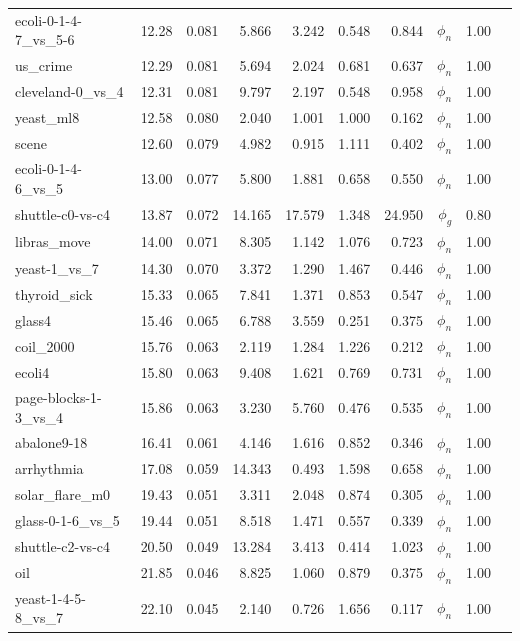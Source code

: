 \begin{longtable}{lrrrrrrrll}
    ecoli-0-1-4-7\_vs\_5-6 & 12.28 & 0.081 & 5.866 & 3.242 & 0.548 & 0.844 & $\phi_{n}$ & 1.00 \\
    us\_crime & 12.29 & 0.081 & 5.694 & 2.024 & 0.681 & 0.637 & $\phi_{n}$ & 1.00 \\
    cleveland-0\_vs\_4 & 12.31 & 0.081 & 9.797 & 2.197 & 0.548 & 0.958 & $\phi_{n}$ & 1.00 \\
    yeast\_ml8 & 12.58 & 0.080 & 2.040 & 1.001 & 1.000 & 0.162 & $\phi_{n}$ & 1.00 \\
    scene & 12.60 & 0.079 & 4.982 & 0.915 & 1.111 & 0.402 & $\phi_{n}$ & 1.00 \\
    ecoli-0-1-4-6\_vs\_5 & 13.00 & 0.077 & 5.800 & 1.881 & 0.658 & 0.550 & $\phi_{n}$ & 1.00 \\
    shuttle-c0-vs-c4 & 13.87 & 0.072 & 14.165 & 17.579 & 1.348 & 24.950 & $\phi_{g}$ & 0.80 \\
    libras\_move & 14.00 & 0.071 & 8.305 & 1.142 & 1.076 & 0.723 & $\phi_{n}$ & 1.00 \\
    yeast-1\_vs\_7 & 14.30 & 0.070 & 3.372 & 1.290 & 1.467 & 0.446 & $\phi_{n}$ & 1.00 \\
    thyroid\_sick & 15.33 & 0.065 & 7.841 & 1.371 & 0.853 & 0.547 & $\phi_{n}$ & 1.00 \\
    glass4 & 15.46 & 0.065 & 6.788 & 3.559 & 0.251 & 0.375 & $\phi_{n}$ & 1.00 \\
    coil\_2000 & 15.76 & 0.063 & 2.119 & 1.284 & 1.226 & 0.212 & $\phi_{n}$ & 1.00 \\
    ecoli4 & 15.80 & 0.063 & 9.408 & 1.621 & 0.769 & 0.731 & $\phi_{n}$ & 1.00 \\
    page-blocks-1-3\_vs\_4 & 15.86 & 0.063 & 3.230 & 5.760 & 0.476 & 0.535 & $\phi_{n}$ & 1.00 \\
    abalone9-18 & 16.41 & 0.061 & 4.146 & 1.616 & 0.852 & 0.346 & $\phi_{n}$ & 1.00 \\
    arrhythmia & 17.08 & 0.059 & 14.343 & 0.493 & 1.598 & 0.658 & $\phi_{n}$ & 1.00 \\
    solar\_flare\_m0 & 19.43 & 0.051 & 3.311 & 2.048 & 0.874 & 0.305 & $\phi_{n}$ & 1.00 \\
    glass-0-1-6\_vs\_5 & 19.44 & 0.051 & 8.518 & 1.471 & 0.557 & 0.339 & $\phi_{n}$ & 1.00 \\
    shuttle-c2-vs-c4 & 20.50 & 0.049 & 13.284 & 3.413 & 0.414 & 1.023 & $\phi_{n}$ & 1.00 \\
    oil & 21.85 & 0.046 & 8.825 & 1.060 & 0.879 & 0.375 & $\phi_{n}$ & 1.00 \\
    yeast-1-4-5-8\_vs\_7 & 22.10 & 0.045 & 2.140 & 0.726 & 1.656 & 0.117 & $\phi_{n}$ & 1.00 \\

\end{longtable}
